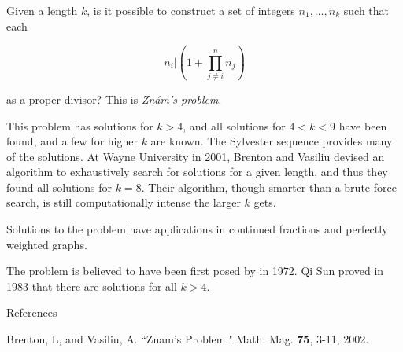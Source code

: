 \documentclass[12pt]{article}
\begin{document}
Given a length $k$, is it possible to construct a set of integers $n_1, \ldots , n_k$ such that each

$$n_i |(1 + \prod_{j \ne i}^n n_j)$$

as a proper divisor? This is \emph{Zn\'am's problem}.

This problem has solutions for $k > 4$, and all solutions for $4 < k < 9$ have been found, and a few for higher $k$ are known. The Sylvester sequence provides many of the solutions. At Wayne  University in 2001, Brenton and Vasiliu devised an algorithm to exhaustively search for solutions for a given length, and thus they found all solutions for $k = 8$. Their algorithm, though smarter than a brute force search, is still computationally intense the larger $k$ gets.

Solutions to the problem have applications in continued fractions and perfectly weighted graphs.

The problem is believed to have been first posed by  in 1972. Qi Sun proved in 1983 that there are solutions for all $k > 4$.

References

Brenton, L, and Vasiliu, A. ``Znam's Problem." Math. Mag. {\bf 75}, 3-11, 2002.
\end{document}
